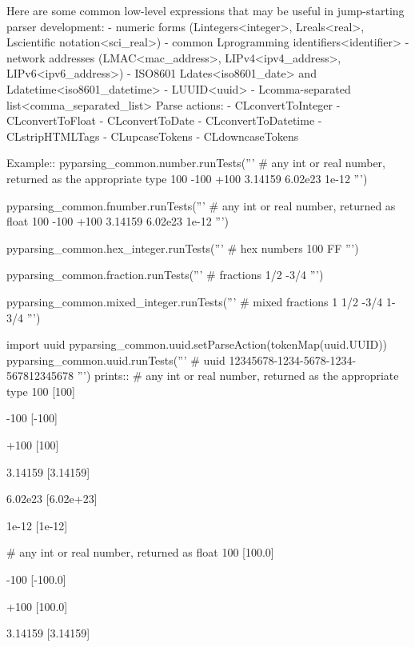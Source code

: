 \begin{DoxyVerb}Here are some common low-level expressions that may be useful in jump-starting parser development:
 - numeric forms (L{integers<integer>}, L{reals<real>}, L{scientific notation<sci_real>})
 - common L{programming identifiers<identifier>}
 - network addresses (L{MAC<mac_address>}, L{IPv4<ipv4_address>}, L{IPv6<ipv6_address>})
 - ISO8601 L{dates<iso8601_date>} and L{datetime<iso8601_datetime>}
 - L{UUID<uuid>}
 - L{comma-separated list<comma_separated_list>}
Parse actions:
 - C{L{convertToInteger}}
 - C{L{convertToFloat}}
 - C{L{convertToDate}}
 - C{L{convertToDatetime}}
 - C{L{stripHTMLTags}}
 - C{L{upcaseTokens}}
 - C{L{downcaseTokens}}

Example::
    pyparsing_common.number.runTests('''
        # any int or real number, returned as the appropriate type
        100
        -100
        +100
        3.14159
        6.02e23
        1e-12
        ''')

    pyparsing_common.fnumber.runTests('''
        # any int or real number, returned as float
        100
        -100
        +100
        3.14159
        6.02e23
        1e-12
        ''')

    pyparsing_common.hex_integer.runTests('''
        # hex numbers
        100
        FF
        ''')

    pyparsing_common.fraction.runTests('''
        # fractions
        1/2
        -3/4
        ''')

    pyparsing_common.mixed_integer.runTests('''
        # mixed fractions
        1
        1/2
        -3/4
        1-3/4
        ''')

    import uuid
    pyparsing_common.uuid.setParseAction(tokenMap(uuid.UUID))
    pyparsing_common.uuid.runTests('''
        # uuid
        12345678-1234-5678-1234-567812345678
        ''')
prints::
    # any int or real number, returned as the appropriate type
    100
    [100]

    -100
    [-100]

    +100
    [100]

    3.14159
    [3.14159]

    6.02e23
    [6.02e+23]

    1e-12
    [1e-12]

    # any int or real number, returned as float
    100
    [100.0]

    -100
    [-100.0]

    +100
    [100.0]

    3.14159
    [3.14159]


\end{DoxyVerb}
